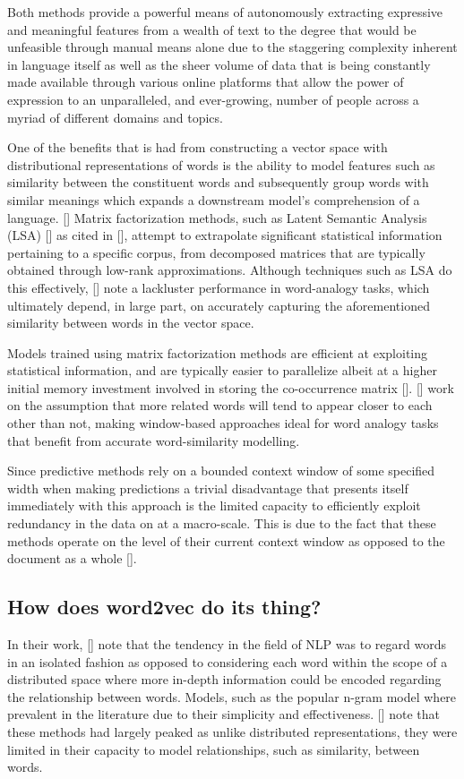 \documentclass[12pt, a4paper]{report}
\theoremstyle{definition}
\theoremstyle{definition}%
\theoremstyle{definition}%
\theoremstyle{definition}%
\theoremstyle{definition}%
\theoremstyle{definition}%
\renewcommand{\cite}[1]{[\citealp{#1}]}
\begin{document}
Both methods provide a powerful means of autonomously extracting expressive and meaningful features from a wealth of text to the degree that would be unfeasible through manual means alone due to the staggering complexity inherent in language itself as well as the sheer volume of data that is being constantly made available through various online platforms that allow the power of expression to an unparalleled, and ever-growing, number of people across a myriad of different domains and topics.

One of the benefits that is had from constructing a vector space with distributional representations of words is the ability to model features such as similarity between the constituent words and subsequently group words with similar meanings which expands a downstream model's comprehension of a language. \cite{mikolov2013b} Matrix factorization methods, such as Latent Semantic Analysis (LSA) \cite{deerwester1990} as cited in \cite{pennington}, attempt to extrapolate significant statistical information pertaining to a specific corpus, from decomposed matrices that are typically obtained through low-rank approximations. Although techniques such as LSA do this effectively, \cite{pennington} note a lackluster performance in word-analogy tasks, which ultimately depend, in large part, on accurately capturing the aforementioned similarity between words in the vector space.

Models trained using matrix factorization methods are efficient at exploiting statistical information, and are typically easier to parallelize albeit at a higher initial memory investment involved in storing the co-occurrence matrix \cite{pennington}. \cite{mikolov2013} work on the assumption that more related words will tend to appear closer to each other than not, making window-based approaches ideal for word analogy tasks that benefit from accurate word-similarity modelling.

Since predictive methods rely on a bounded context window of some specified width when making predictions a trivial disadvantage that presents itself immediately with this approach is the limited capacity to efficiently exploit redundancy in the data on at a macro-scale. This is due to the fact that these methods operate on the level of their current context window as opposed to the document as a whole \cite{pennington}.

\subsection{How does word2vec do its thing?}
In their work, \cite{mikolov2013} note that the tendency in the field of NLP was to regard words in an isolated fashion as opposed to considering each word within the scope of a distributed space where more in-depth information could be encoded regarding the relationship between words. Models, such as the popular n-gram model where prevalent in the literature due to their simplicity and effectiveness. \cite{mikolov2013b} note that these methods had largely peaked as unlike distributed representations, they were limited in their capacity to model relationships, such as similarity, between words.
\end{document}
